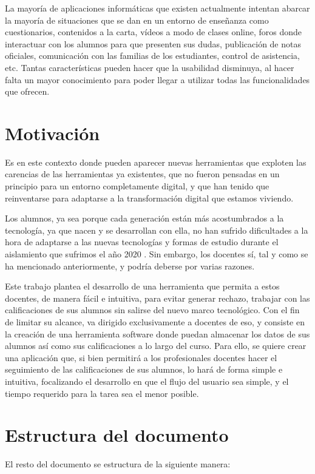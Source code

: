 La mayoría de aplicaciones informáticas que existen actualmente intentan abarcar la mayoría de situaciones que se dan en un entorno de enseñanza como cuestionarios, contenidos a la carta, vídeos a modo de clases online, foros donde interactuar con los alumnos para que presenten sus dudas, publicación de notas oficiales, comunicación con las familias de los estudiantes, control de asistencia, etc. Tantas características pueden hacer que la usabilidad disminuya, al hacer falta un mayor conocimiento para poder llegar a utilizar todas las funcionalidades que ofrecen.


\section{Motivación}

Es en este contexto donde pueden aparecer nuevas herramientas que exploten las carencias de las herramientas ya existentes, que no fueron pensadas en un principio para un entorno completamente digital, y que han tenido que reinventarse para adaptarse a la transformación digital que estamos viviendo. 

Los alumnos, ya sea porque cada generación están más acostumbrados a la tecnología, ya que nacen y se desarrollan con ella, no han sufrido dificultades a la hora de adaptarse a las nuevas tecnologías y formas de estudio durante el aislamiento que sufrimos el año 2020 \cite{bogdandy2020digital}. Sin embargo, los docentes sí, tal y como se ha mencionado anteriormente, y podría deberse por varias razones.

Este trabajo plantea el desarrollo de una herramienta que permita a estos docentes, de manera fácil e intuitiva, para evitar generar rechazo, trabajar con las calificaciones de sus alumnos sin salirse del nuevo marco tecnológico. Con el fin de limitar su alcance, va dirigido exclusivamente a docentes de \gls{eso}, y consiste en la creación de una herramienta software donde puedan almacenar los datos de sus alumnos así como sus calificaciones a lo largo del curso. Para ello, se quiere crear una aplicación que, si bien permitirá a los profesionales docentes hacer el seguimiento de las calificaciones de sus alumnos, lo hará de forma simple e intuitiva, focalizando el desarrollo en que el flujo del usuario sea simple, y el tiempo requerido para la tarea sea el menor posible.


\section{Estructura del documento}
El resto del documento se estructura de la siguiente manera:

